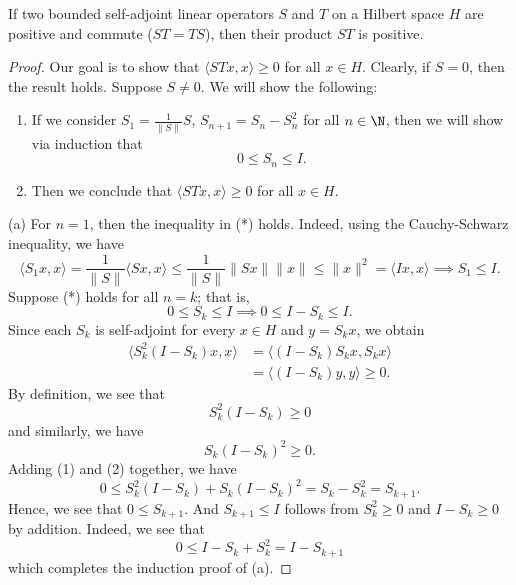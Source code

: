 \begin{theorem}
    If two bounded self-adjoint linear operators \( S  \) and \( T  \) on a Hilbert space \( H  \) are positive and commute (\( ST  = TS \)), then their product \( S T  \) is positive.
\end{theorem}

\begin{proof}
Our goal is to show that \( \langle ST x  , x  \rangle \geq 0  \) for all \( x \in H \). Clearly, if \( S = 0  \), then the result holds. Suppose \( S \neq 0  \). We will show the following:
\begin{enumerate}
    \item[(a)] If we consider \( {S}_{1} = \frac{ 1 }{ \|S\| }  S  \), \( {S}_{n+1} = {S}_{n} - {S}_{n}^{2} \) for all \( n \in \N \), then we will show via induction that 
        \[  0 \leq {S}_{n} \leq  I. \tag{*} \]
    \item[(b)] Then we conclude that \( \langle ST x  ,  x  \rangle \geq 0  \) for all \( x \in H  \). 
\end{enumerate}

(a) For \( n = 1  \), then the inequality in (*) holds. Indeed, using the Cauchy-Schwarz inequality, we have 
\[  \langle {S}_{1} x  ,  x  \rangle = \frac{ 1  }{  \|S \| }  \langle Sx  ,  x  \rangle \leq \frac{ 1  }{ \|S\| } \|Sx \| \|x \| \leq \|x\|^{2} = \langle Ix  ,  x  \rangle \implies {S}_{1} \leq I. \]
Suppose (*) holds for all \( n = k  \); that is, 
\[  0 \leq {S}_{k} \leq I \implies 0 \leq I - {S}_{k} \leq I. \]
Since each \( {S}_{k} \) is self-adjoint for every \( x \in H  \) and \( y = {S}_{k}x  \), we obtain
\begin{align*}
    \langle {S}_{k}^{2}(I - {S}_{k})x  ,  x  \rangle &= \langle (I - {S}_{k}){S}_{k}x  ,  {S}_{k } x  \rangle \\
                                                     &= \langle (I - {S}_{k}) y  , y \rangle \geq 0.
\end{align*}
By definition, we see that 
\[  {S}_{k}^{2} (I - {S}_{k}) \geq 0 \tag{1}  \]
and similarly, we have 
\[  {S}_{k}(I - {S}_{k})^{2} \geq 0.  \tag{2} \]
Adding (1) and (2) together, we have 
\[  0 \leq {S}_{k}^{2} (I - {S}_{k}) + {S}_{k}(I - {S}_{k})^{2} = {S}_{k} - {S}_{k}^{2} = {S}_{k+1}. \]
Hence, we see that \(  0 \leq {S}_{k+1}  \). And \( {S}_{k+1} \leq I  \) follows from \( {S}_{k}^{2} \geq 0  \) and \( I - {S}_{k} \geq 0  \) by addition. Indeed, we see that 
\[  0 \leq I - {S}_{k} + {S}_{k}^{2} = I - {S}_{k+1} \]
which completes the induction proof of (a).


\end{proof}
